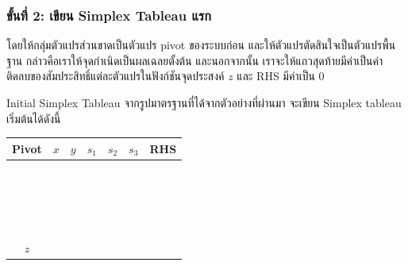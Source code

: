 \subsubsection*{ขั้นที่ 2: เขียน Simplex Tableau แรก}
โดยให้กลุ่มตัวแปรส่วนขาดเป็นตัวแปร pivot ของระบบก่อน และให้ตัวแปรตัดสินใจเป็นตัวแปรพื้นฐาน กล่าวคือเราให้จุดกำเนิดเป็นผลเฉลยตั้งต้น
และนอกจากนั้น เราจะให้แถวสุดท้ายมีค่าเป็นค่าติดลบของสัมประสิทธิ์แต่ละตัวแปรในฟังก์ชันจุดประสงค์ $z$ และ RHS มีค่าเป็น 0
\begin{example}
    {Initial Simplex Tableau}{}
    จากรูปมาตรฐานที่ได้จากตัวอย่างที่ผ่านมา จะเขียน Simplex tableau เริ่มต้นได้ดังนี้
    \begin{center}
    \renewcommand{\arraystretch}{1.4}
        \begin{tabular}{|c|ccccc|c|}
            \hline
            \textbf{Pivot} & $x$ & $y$ &  $s_1$ & $s_2$ & $s_3$ & \textbf{RHS} \\
            \hline
            $ $ & $ $ & $ $  & $ $ & $ $ & $ $ & $ $ \\
            $ $ & $ $ & $ $  & $ $ & $ $ & $ $ & $ $ \\
            $ $ & $ $ & $ $  & $ $ & $ $ & $ $ & $ $ \\
            $ $ & $ $ & $ $  & $ $ & $ $ & $ $ & $ $ \\
            \hline
            $z$ & $ $ & $ $  & $ $ & $ $ & $ $ & $ $ \\
            \hline
        \end{tabular}
    \end{center}
\end{example}

